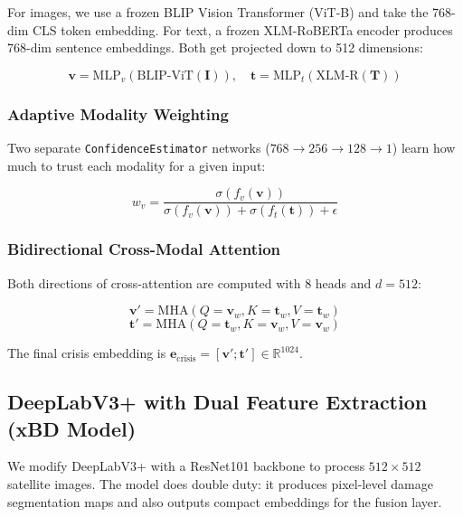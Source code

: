 \documentclass[journal]{IEEEtran}
\begin{document}
For images, we use a frozen BLIP Vision Transformer (ViT-B) and take the 768-dim CLS token embedding. For text, a frozen XLM-RoBERTa encoder produces 768-dim sentence embeddings. Both get projected down to 512 dimensions:

\begin{equation}
\mathbf{v} = \text{MLP}_v(\text{BLIP-ViT}(\mathbf{I})), \quad \mathbf{t} = \text{MLP}_t(\text{XLM-R}(\mathbf{T}))
\end{equation}

\subsubsection{Adaptive Modality Weighting}

Two separate \texttt{ConfidenceEstimator} networks ($768 \to 256 \to 128 \to 1$) learn how much to trust each modality for a given input:

\begin{equation}
w_v = \frac{\sigma(f_v(\mathbf{v}))}{\sigma(f_v(\mathbf{v})) + \sigma(f_t(\mathbf{t})) + \epsilon}
\end{equation}

\subsubsection{Bidirectional Cross-Modal Attention}

Both directions of cross-attention are computed with 8 heads and $d=512$:

\begin{equation}
\mathbf{v}' = \text{MHA}(Q{=}\mathbf{v}_w, K{=}\mathbf{t}_w, V{=}\mathbf{t}_w)
\end{equation}
\begin{equation}
\mathbf{t}' = \text{MHA}(Q{=}\mathbf{t}_w, K{=}\mathbf{v}_w, V{=}\mathbf{v}_w)
\end{equation}

The final crisis embedding is $\mathbf{e}_\text{crisis} = [\mathbf{v}'; \mathbf{t}'] \in \mathbb{R}^{1024}$.

\subsection{DeepLabV3+ with Dual Feature Extraction (xBD Model)}

We modify DeepLabV3+ with a ResNet101 backbone to process $512 \times 512$ satellite images. The model does double duty: it produces pixel-level damage segmentation maps and also outputs compact embeddings for the fusion layer.
\end{document}
